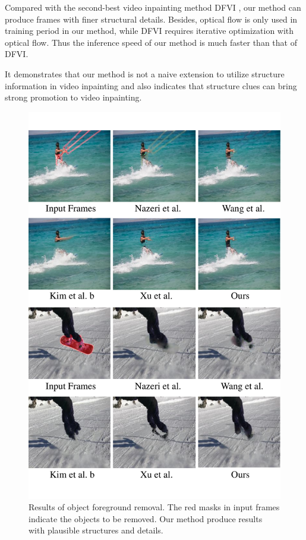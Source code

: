 Compared with the second-best video inpainting method DFVI \cite{Xu_2019_CVPR}, our method can produce frames with finer structural details. Besides, optical flow is only used in training period in our method, while DFVI requires iterative optimization with optical flow. Thus the inference speed of our method is much faster than that of DFVI.
%

It demonstrates that our method is not a naive extension to utilize structure information in video inpainting and also indicates that structure clues can bring strong promotion to video inpainting.



%



\begin{figure}[t]
	\centering
	\includegraphics[width=0.85\columnwidth]{vis_forg} %
	\caption{Results of object foreground removal. The red masks in input frames indicate the objects to be removed. Our method produce results with plausible structures and details.}
	\label{vis_forg}
\end{figure}

